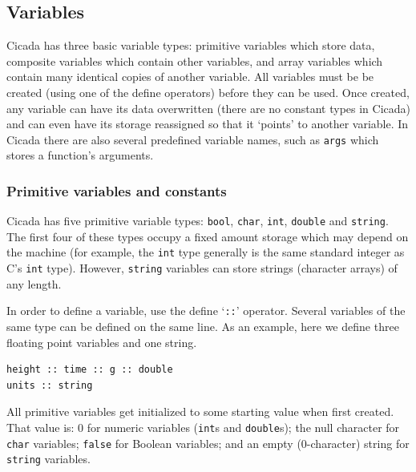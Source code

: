 \documentclass{article}
\newenvironment{code}{
       \begin{list}{}{
               \setlength{\leftmargin}{.4in}
               \setlength{\rightmargin}{0in}
               \setlength{\topsep}{.2in}
       }
       \small
       \item[] }
       { \end{list}   }
\begin{document}

\subsection{Variables}

Cicada has three basic variable types: primitive variables which store data, composite variables which contain other variables, and array variables which contain many identical copies of another variable.  All variables must be be created (using one of the define operators) before they can be used.  Once created, any variable can have its data overwritten (there are no constant types in Cicada) and can even have its storage reassigned so that it `points' to another variable.  In Cicada there are also several predefined variable names, such as \verb#args# which stores a function's arguments.


\subsubsection{Primitive variables and constants}

 Cicada has five primitive variable types:  \verb#bool#, \verb#char#, \verb#int#, \verb#double# and \verb#string#.  The first four of these types occupy a fixed amount storage which may depend on the machine (for example, the \verb#int# type generally is the same standard integer as C's \verb#int# type).  However, \verb#string# variables can store strings (character arrays) of any length.

In order to define a variable, use the define `\texttt{::}' operator.  Several variables of the same type can be defined on the same line.  As an example, here we define three floating point variables and one string.

\begin{code} \begin{verbatim}
height :: time :: g :: double
units :: string
\end{verbatim} \end{code}

All primitive variables get initialized to some starting value when first created.  That value is:  0 for numeric variables (\verb#int#s and \verb#double#s); the null character for \verb#char# variables; \verb#false# for Boolean variables; and an empty (0-character) string for \verb#string# variables.
\end{document}
